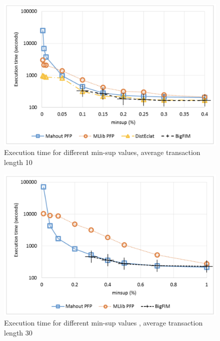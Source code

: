 \begin{figure}
  \centering
  \includegraphics[width=\linewidth]{figures/sparkVsHadoopfig6}
  \caption{Execution time for different min-sup values, average transaction length 10}
  \label{fig:sparkVsHadoopfig6}
\end{figure}

\begin{figure}
  \centering
  \includegraphics[width=\linewidth]{figures/sparkVsHadoopfig7}
  \caption{ Execution time for different min-sup values , average transaction length 30}
  \label{fig:sparkVsHadoopfig7}
\end{figure}
